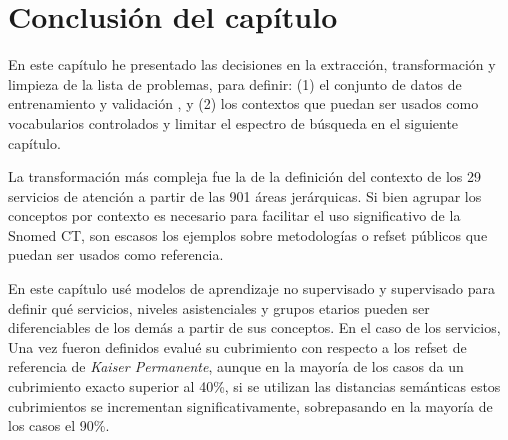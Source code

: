 \section{Conclusión del capítulo}
En este capítulo he presentado las decisiones en la extracción, transformación y limpieza de la lista de problemas, para definir: (1) el conjunto de datos de entrenamiento y validación , y (2) los contextos que puedan ser usados como vocabularios controlados y limitar el espectro de búsqueda en el siguiente capítulo.

La transformación más compleja fue la de la definición del contexto de los 29 servicios de atención a partir de las 901 áreas jerárquicas. Si bien agrupar los conceptos por contexto es necesario para facilitar el uso significativo de la Snomed CT, son escasos los ejemplos sobre metodologías o  {\acrshort{refset}} públicos que puedan ser usados como referencia.

En este capítulo usé modelos de aprendizaje no supervisado y supervisado para definir qué servicios, niveles asistenciales y grupos etarios pueden ser diferenciables de los demás a partir de sus conceptos. En el caso de los servicios, Una vez fueron definidos evalué su cubrimiento con respecto a los  {\acrshort{refset}} de referencia de \textit{Kaiser Permanente}, aunque en la mayoría de los casos da un cubrimiento exacto superior al 40\%, si se utilizan las distancias semánticas estos cubrimientos se incrementan significativamente, sobrepasando en la mayoría de los casos el 90\%.
